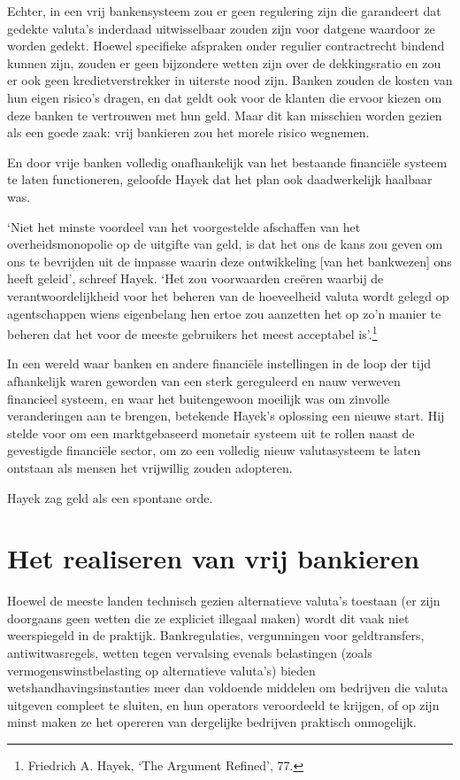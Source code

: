 \documentclass[smalldemyvopaper,11pt,twoside,onecolumn,openright,extrafontsizes,hidelinks]{memoir}
\begin{document}
Echter, in een vrij bankensysteem zou er geen regulering zijn die
garandeert dat gedekte valuta's inderdaad uitwisselbaar zouden zijn voor
datgene waardoor ze worden gedekt. Hoewel specifieke afspraken onder
regulier contractrecht bindend kunnen zijn, zouden er geen bijzondere
wetten zijn over de dekkingsratio en zou er ook geen kredietverstrekker
in uiterste nood zijn. Banken zouden de kosten van hun eigen risico's
dragen, en dat geldt ook voor de klanten die ervoor kiezen om deze
banken te vertrouwen met hun geld. Maar dit kan misschien worden gezien
als een goede zaak: vrij bankieren zou het morele risico wegnemen.

En door vrije banken volledig onafhankelijk van het bestaande financiële
systeem te laten functioneren, geloofde Hayek dat het plan ook
daadwerkelijk haalbaar was.

`Niet het minste voordeel van het voorgestelde afschaffen van het
overheidsmonopolie op de uitgifte van geld, is dat het ons de kans zou
geven om ons te bevrijden uit de impasse waarin deze ontwikkeling {[}van
het bankwezen{]} ons heeft geleid', schreef Hayek. `Het zou voorwaarden
creëren waarbij de verantwoordelijkheid voor het beheren van de
hoeveelheid valuta wordt gelegd op agentschappen wiens eigenbelang hen
ertoe zou aanzetten het op zo'n manier te beheren dat het voor de meeste
gebruikers het meest acceptabel is'.\footnote{Friedrich A. Hayek, `The
  Argument Refined', 77.}

In een wereld waar banken en andere financiële instellingen in de loop
der tijd afhankelijk waren geworden van een sterk gereguleerd en nauw
verweven financieel systeem, en waar het buitengewoon moeilijk was om
zinvolle veranderingen aan te brengen, betekende Hayek's oplossing een
nieuwe start. Hij stelde voor om een marktgebaseerd monetair systeem uit
te rollen naast de gevestigde financiële sector, om zo een volledig
nieuw valutasysteem te laten ontstaan als mensen het vrijwillig zouden
adopteren.

Hayek zag geld als een spontane orde.

\section{Het realiseren van vrij
bankieren}\label{het-realiseren-van-vrij-bankieren}

Hoewel de meeste landen technisch gezien alternatieve valuta's toestaan
(er zijn doorgaans geen wetten die ze expliciet illegaal maken) wordt
dit vaak niet weerspiegeld in de praktijk. Bankregulaties, vergunningen
voor geldtransfers, antiwitwasregels, wetten tegen vervalsing evenals
belastingen (zoals vermogenswinstbelasting op alternatieve valuta's)
bieden wetshandhavingsinstanties meer dan voldoende middelen om
bedrijven die valuta uitgeven compleet te sluiten, en hun operators
veroordeeld te krijgen, of op zijn minst maken ze het opereren van
dergelijke bedrijven praktisch onmogelijk.
\end{document}
